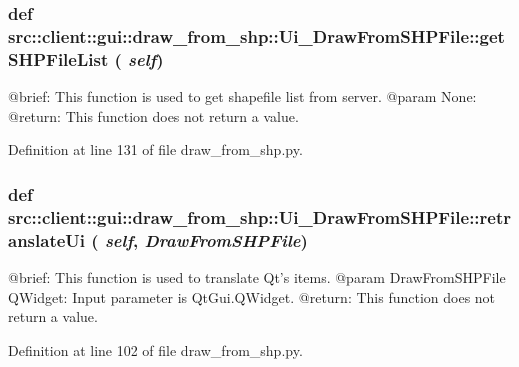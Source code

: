 \hypertarget{classsrc_1_1client_1_1gui_1_1draw__from__shp_1_1Ui__DrawFromSHPFile_ae5a423b3c42a4c0470ff89a33d4691ab}{
\subsubsection[{getSHPFileList}]{\setlength{\rightskip}{0pt plus 5cm}def src::client::gui::draw\_\-from\_\-shp::Ui\_\-DrawFromSHPFile::getSHPFileList ( {\em self})}}
\label{classsrc_1_1client_1_1gui_1_1draw__from__shp_1_1Ui__DrawFromSHPFile_ae5a423b3c42a4c0470ff89a33d4691ab}
\begin{DoxyVerb}
@brief: This function is used to get shapefile list from server.
@param None:
@return: This function does not return a value.
\end{DoxyVerb}
 

Definition at line 131 of file draw\_\-from\_\-shp.py.

\hypertarget{classsrc_1_1client_1_1gui_1_1draw__from__shp_1_1Ui__DrawFromSHPFile_a20d3304d04c95c8740827a691441df7b}{
\subsubsection[{retranslateUi}]{\setlength{\rightskip}{0pt plus 5cm}def src::client::gui::draw\_\-from\_\-shp::Ui\_\-DrawFromSHPFile::retranslateUi ( {\em self}, \/   {\em DrawFromSHPFile})}}
\label{classsrc_1_1client_1_1gui_1_1draw__from__shp_1_1Ui__DrawFromSHPFile_a20d3304d04c95c8740827a691441df7b}
\begin{DoxyVerb}
@brief: This function is used to translate Qt's items.
@param DrawFromSHPFile QWidget: Input parameter is QtGui.QWidget.
@return: This function does not return a value.
\end{DoxyVerb}
 

Definition at line 102 of file draw\_\-from\_\-shp.py.

